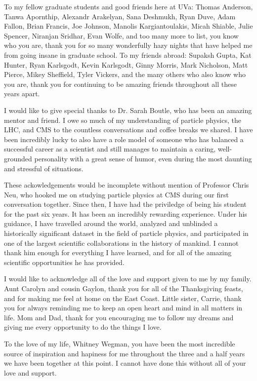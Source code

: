 \par To my fellow graduate students and good friends here at UVa:
Thomas Anderson, Tanwa Apornthip, Alexandr Arakelyan, Sana Deshmukh,
Ryan Duve, Adam Fallon, Brian Francis, Joe Johnson, Manolis
Kargiantoulakis, Micah Shiable, Julie Spencer, Niranjan Sridhar, Evan
Wolfe, and too many more to list, you know who you are, thank you for
so many wonderfully hazy nights that have helped me from going insane
in graduate school. To my friends abroad: Supaksh Gupta, Kat Hunter,
Ryan Karlsgodt, Kevin Karlsgodt, Ginny Morris, Mark Nicholson, Matt
Pierce, Mikey Sheffield, Tyler Vickers, and the many others who also
know who you are, thank you for continuing to be amazing friends
throughout all these years apart.  

\par  I would like to give special thanks to Dr. Sarah Boutle, who has
been an amazing mentor and friend.   I owe so much of my understanding
of particle physics, the LHC, and CMS to the countless conversations
and coffee breaks we shared.  I have been incredibly lucky to also
have a role model of someone who has balanced a successful career as
a scientist and still manages to maintain a caring, well-grounded
personality with a great sense of humor, even during the most daunting
and stressful of situations.    

\par These ackowledgements would be incomplete without mention of
Professor Chris Neu, who hooked me on studying particle physics at CMS
during our first conversation together.  Since then, I have had the
priviledge of being his student for the past six years.  It has been
an incredibly rewarding experience.  Under his guidance, I have
travelled around the world, analyzed and unblinded a
historically significant dataset in the field of particle physics, and
participated in one of the largest scientific collaborations in the
history of mankind.  I cannot thank him enough for everything I have
learned, and for all of the amazing scientific opportunities he has
provided.

\par I would like to acknowledge all of the love and support given to
me by my family.  Aunt Carolyn and cousin Gaylon, thank you for all of
the Thanksgiving feasts, and for making me feel at home on the East
Coast.  Little sister, Carrie, thank you for always reminding me to
keep an open heart and mind in all matters in life.  Mom and Dad,
thank for you encouraging me to follow my dreams and giving me every
opportunity to do the things I love.     

\par To the love of my life, Whitney Wegman, you have been the most
incredible source of inspiration and hapiness for me throughout the
three and a half years we have been together at this point.  I cannot
have done this without all of your love and support.  
